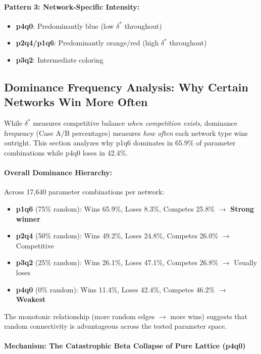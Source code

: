 \documentclass[12pt,a4paper]{article}
\begin{document}
\paragraph{Pattern 3: Network-Specific Intensity:}
\begin{itemize}
    \item \textbf{p4q0}: Predominantly blue (low $\delta^*$ throughout)
    \item \textbf{p2q4/p1q6}: Predominantly orange/red (high $\delta^*$ throughout)
    \item \textbf{p3q2}: Intermediate coloring
\end{itemize}

\subsection{Dominance Frequency Analysis: Why Certain Networks Win More Often}

While $\delta^*$ measures competitive balance \textit{when competition exists}, dominance frequency (Case A/B percentages) measures \textit{how often} each network type wins outright. This section analyzes why p1q6 dominates in 65.9\% of parameter combinations while p4q0 loses in 42.4\%.

\paragraph{Overall Dominance Hierarchy:}

Across 17,640 parameter combinations per network:
\begin{itemize}
    \item \textbf{p1q6} (75\% random): Wins 65.9\%, Loses 8.3\%, Competes 25.8\% $\to$ \textbf{Strong winner}
    \item \textbf{p2q4} (50\% random): Wins 49.2\%, Loses 24.8\%, Competes 26.0\% $\to$ Competitive
    \item \textbf{p3q2} (25\% random): Wins 26.1\%, Loses 47.1\%, Competes 26.8\% $\to$ Usually loses
    \item \textbf{p4q0} (0\% random): Wins 11.4\%, Loses 42.4\%, Competes 46.2\% $\to$ \textbf{Weakest}
\end{itemize}

The monotonic relationship (more random edges $\to$ more wins) suggests that random connectivity is advantageous across the tested parameter space.

\paragraph{Mechanism: The Catastrophic Beta Collapse of Pure Lattice (p4q0)}
\end{document}
